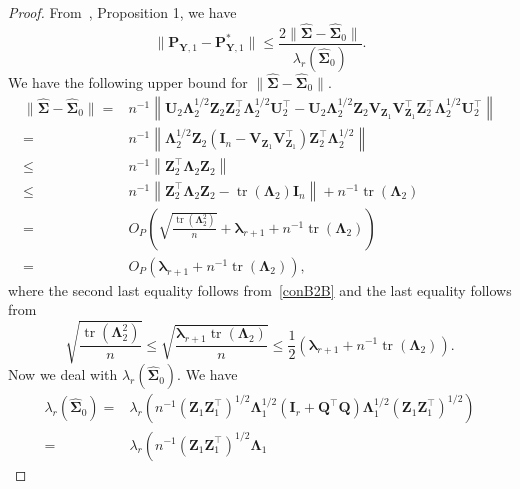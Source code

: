 \documentclass[12pt]{article} %
\DeclareMathOperator{\mytr}{tr}
\newcommand{\bQ}{\mathbf{Q}}
\newcommand{\bZ}{\mathbf{Z}}
\newcommand{\bP}{\mathbf{P}}
\newcommand{\bY}{\mathbf{Y}}
\newcommand{\bI}{\mathbf{I}}
\newcommand{\bU}{\mathbf{U}}
\newcommand{\bV}{\mathbf{V}}
\newcommand{\bfsym}[1]{\ensuremath{\boldsymbol{#1}}}
\def\blambda {\bfsym {\lambda}}
\def\bLambda {\bfsym {\Lambda}}
\def\bSigma {\bfsym {\Sigma}}
\theoremstyle{definition}
\begin{document}
\begin{appendices}
\begin{proof}
    From~\cite{Cai2015Optimal}, Proposition 1, we have
    \begin{equation}\label{asd1}
        \|\bP_{\bY,1} -\bP_{\bY,1}^* \|
        \leq 
        \frac{2\|\hat{\bSigma}-\hat{\bSigma}_0\|}{\lambda_r(\hat{\bSigma}_0)}.
    \end{equation}
    We have the following upper bound for $\|\hat{\bSigma}-\hat{\bSigma}_0\|$.
    \begin{equation}\label{asd2}
        \begin{split}
            \|\hat{\bSigma}-\hat{\bSigma}_0\|
            =&
    n^{-1}\left\|\bU_2 \bLambda_2^{1/2} \bZ_2  
    \bZ_2^\top \bLambda_2^{1/2}\bU_2^\top
    -\bU_2 \bLambda_2^{1/2} \bZ_2 
    \bV_{\bZ_1}
    \bV_{\bZ_1}^\top
    \bZ_2^\top \bLambda_2^{1/2}\bU_2^\top
    \right\|
    \\
     =&
    n^{-1}\left\|
     \bLambda_2^{1/2} \bZ_2 
    (\bI_n-\bV_{\bZ_1}
    \bV_{\bZ_1}^\top)
    \bZ_2^\top \bLambda_2^{1/2}
    \right\|
    \\
    \leq &
    n^{-1}\left\|\bZ_2^\top \bLambda_2 \bZ_2\right\|
    \\
 \leq& 
     n^{-1}\left\| \bZ_2^\top \bLambda_2\bZ_2-\mytr(\bLambda_2)\bI_n\right\|
     +n^{-1}
     \mytr(\bLambda_2)
     \\
     =&O_P\left( 
\sqrt{\frac{\mytr\left(\bLambda_2^2\right)}{n}}+\blambda_{r+1}
     +
     n^{-1}\mytr(\bLambda_2)
 \right)
 \\
     =&O_P\left( 
\blambda_{r+1}
     +
     n^{-1}\mytr(\bLambda_2)
 \right)
 ,
    \end{split}
\end{equation}
where
the second last equality follows from~\eqref{conB2B} and the last equality follows from
\begin{equation*}
    \sqrt{\frac{\mytr\left(\bLambda_2^2\right)}{n}}
    \leq
    \sqrt{\frac{\blambda_{r+1}\mytr\left(\bLambda_2\right)}{n}}
    \leq
    \frac{1}{2}\left(\blambda_{r+1}+n^{-1}\mytr\left(\bLambda_2\right)\right).
\end{equation*}
Now we deal with $\lambda_r(\hat{\bSigma}_0)$.
We have
\begin{equation*}
    \begin{split}
     \lambda_r(\hat{\bSigma}_0)
     =&\lambda_r\left(
n^{-1}
  (\bZ_1\bZ_1^\top)^{1/2}\bLambda_1^{1/2}(\bI_r +\bQ^\top \bQ)\bLambda_1^{1/2} (\bZ_1\bZ_1^\top)^{1/2}
     \right)
     \\
     =&
     \lambda_r\left(
        n^{-1} (\bZ_1\bZ_1^\top)^{1/2}
         \bLambda_1 

\end{split}
\end{equation*}
\end{proof}
\end{appendices}
\end{document}
